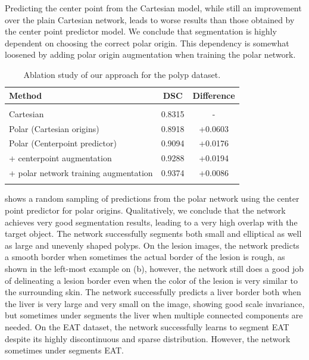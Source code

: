 Predicting the center point from the Cartesian model, while still an improvement over the plain 
Cartesian network, leads to worse results than those obtained by the center point predictor model. 
We conclude that segmentation is highly dependent on choosing the correct polar origin. This 
dependency is somewhat loosened by adding polar origin augmentation when training the polar 
network.

	\begin{table}[t]
\centering
\def\arraystretch{1.25}
\begin{tabular}{l c c}
 \hline
 Method & DSC & Difference \\ 
 \hline \\ [-2ex]
Cartesian & 0.8315 & - \\
Polar (Cartesian origins) & 0.8918  & +0.0603 \\
Polar (Centerpoint predictor) & 0.9094 & +0.0176  \\
 + centerpoint augmentation & 0.9288 & +0.0194 \\
 + polar network training augmentation & 0.9374 & +0.0086 \\ [1ex]
\hline \\ [-1.5ex]
\end{tabular}
\caption{Ablation study of our approach for the polyp dataset.}
\label{table:ablation}
\end{table}

 shows a random sampling of predictions from the polar network using the center point predictor for polar origins. Qualitatively, we conclude that the network achieves very good segmentation results, leading to a very high overlap with the target object. The network successfully segments both small and elliptical as well as large and unevenly shaped polyps. On the lesion images, the network predicts a smooth border when sometimes the actual border of the lesion is rough, as shown in the left-most example on (b), however, the network still does a good job of delineating a lesion border even when the color of the lesion is very similar to the surrounding skin. The network successfully predicts a liver border both when the liver is very large and very small on the image, showing good scale invariance, but sometimes under segments the liver when multiple connected components are needed. On the EAT dataset, the network successfully learns to segment EAT despite its highly discontinuous and sparse distribution. However, the network sometimes under segments EAT.

